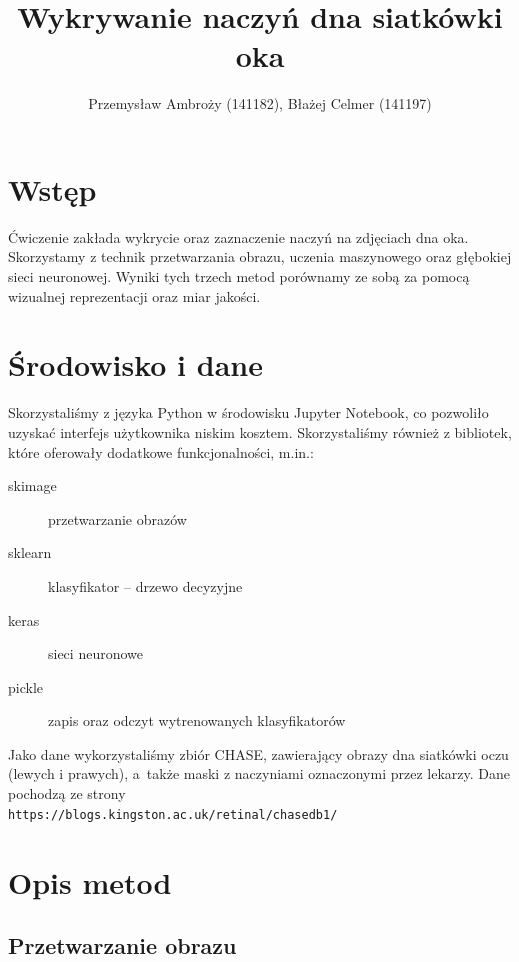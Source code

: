 \documentclass[polish,polish,a4paper]{article}
\title{Wykrywanie naczyń dna siatkówki oka}
\author{Przemysław Ambroży (141182), Błażej Celmer (141197)}
\begin{document}
 
	\maketitle
	
	\section{Wstęp}
		Ćwiczenie zakłada wykrycie oraz zaznaczenie naczyń na zdjęciach dna oka. 
		Skorzystamy z technik przetwarzania obrazu, uczenia maszynowego oraz głębokiej sieci neuronowej.
		Wyniki tych trzech metod porównamy ze sobą za pomocą wizualnej reprezentacji oraz miar jakości.
		
	\section{Środowisko i dane}
		Skorzystaliśmy z języka Python w środowisku Jupyter Notebook,
		co pozwoliło uzyskać interfejs użytkownika niskim kosztem.
		Skorzystaliśmy również z bibliotek, które oferowały dodatkowe funkcjonalności, m.in.:
		
		\begin{description}
			\item[skimage] przetwarzanie obrazów
			\item [sklearn] klasyfikator -- drzewo decyzyjne
			\item [keras] sieci neuronowe 
			\item [pickle] zapis oraz odczyt wytrenowanych klasyfikatorów
		\end{description}
		
		Jako dane wykorzystaliśmy zbiór CHASE, zawierający obrazy dna siatkówki oczu (lewych i prawych),
		a~także maski z naczyniami oznaczonymi przez lekarzy. 
		Dane pochodzą ze strony \\ \texttt{https://blogs.kingston.ac.uk/retinal/chasedb1/}
		
	\section{Opis metod}
		\subsection{Przetwarzanie obrazu}
		
\end{document}
